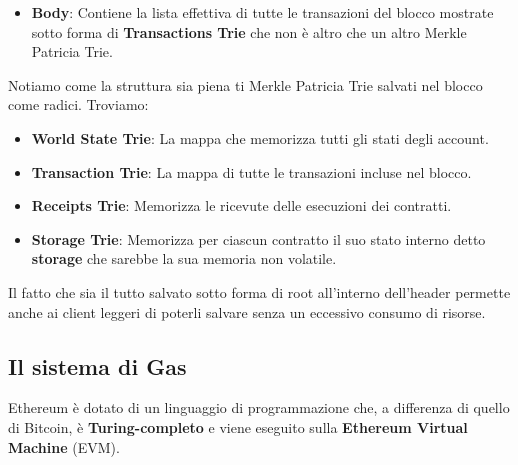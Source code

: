 \begin{itemize}
\begin{itemize}
        \item \textbf{gasLimit:} La quantità massima di gas che può essere consumata complessivamente dalle transazioni all'interno di questo blocco. Determina, di fatto, la dimensione massima computazionale del blocco stesso.
        \item \textbf{gasUsed:} La quantità totale ed effettiva di gas che è stata consumata per eseguire tutte le transazioni contenute nel blocco.
        \item \textbf{timestamp:} Il momento esatto in cui il blocco è stato convalidato, espresso in secondi secondo lo standard Unix (Unix epoch). Post-Merge, coincide precisamente con l'inizio dello slot temporale.
        \item \textbf{extraData:} Un campo di byte libero e opzionale che il validatore può utilizzare per inserire informazioni arbitrarie (ad esempio note testuali o firme), entro un limite prefissato di dimensioni.
    \end{itemize}
    I campi sbarrati nell'immagine (\texttt{ommersHash} e \texttt{difficulty}) sono stati rimossi o azzerati a seguito del passaggio di Ethereum alla Proof-of-Stake (The Merge), in quanto legati al vecchio sistema basato sulla Proof-of-Work.
    \item \textbf{Body}: Contiene la lista effettiva di tutte le transazioni del blocco mostrate sotto forma di \textbf{Transactions Trie} che non è altro che un altro Merkle Patricia Trie.
\end{itemize}
Notiamo come la struttura sia piena ti Merkle Patricia Trie salvati nel blocco come radici. Troviamo:
\begin{itemize}
    \item \textbf{World State Trie}: La mappa che memorizza tutti gli stati degli account. 
    \item \textbf{Transaction Trie}: La mappa di tutte le transazioni incluse nel blocco.
    \item \textbf{Receipts Trie}: Memorizza le ricevute delle esecuzioni dei contratti.
    \item \textbf{Storage Trie}: Memorizza per ciascun contratto il suo stato interno detto \textbf{storage} che sarebbe la sua memoria non volatile.
\end{itemize}
Il fatto che sia il tutto salvato sotto forma di root all'interno dell'header permette anche ai client leggeri di poterli salvare senza un eccessivo consumo di risorse.
\subsection{Il sistema di Gas}
Ethereum è dotato di un linguaggio di programmazione che, a differenza di quello di Bitcoin, è \textbf{Turing-completo} e viene eseguito sulla \textbf{Ethereum Virtual Machine} (EVM).

